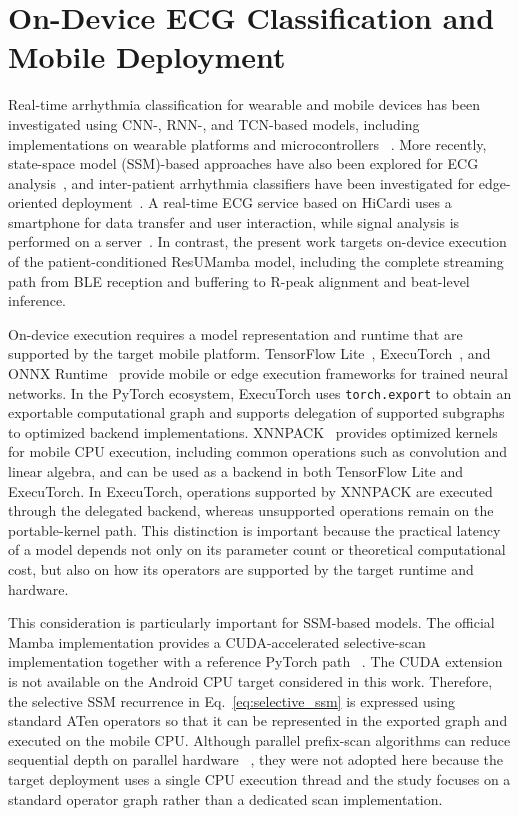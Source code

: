 \section{On-Device ECG Classification and Mobile Deployment}
\label{sec:bg_mobile_deployment}

Real-time arrhythmia classification for wearable and mobile devices has
been investigated using CNN-, RNN-, and TCN-based models, including
implementations on wearable platforms and microcontrollers
~\cite{kiranyaz2016realtime,faraone2020crnn,ingolfsson2021ecgtcn,lee2022compressed}.
More recently, state-space model (SSM)-based approaches have also been
explored for ECG analysis~\cite{lee2025atrial,bathini2026mamba}, and
inter-patient arrhythmia classifiers have been investigated for
edge-oriented deployment~\cite{xu2026cardiolike}.
A real-time ECG service based on HiCardi uses a smartphone for data
transfer and user interaction, while signal analysis is performed on a
server~\cite{park2024realtime}. In contrast, the present work targets
on-device execution of the patient-conditioned ResUMamba model,
including the complete streaming path from BLE reception and buffering
to R-peak alignment and beat-level inference.

On-device execution requires a model representation and runtime that
are supported by the target mobile platform.
TensorFlow Lite~\cite{tflite}, ExecuTorch~\cite{executorch}, and ONNX
Runtime~\cite{onnxruntime} provide mobile or edge execution frameworks
for trained neural networks. In the PyTorch ecosystem, ExecuTorch uses
\texttt{torch.export} to obtain an exportable computational graph and
supports delegation of supported subgraphs to optimized backend
implementations. XNNPACK~\cite{xnnpack} provides optimized kernels for
mobile CPU execution, including common operations such as convolution
and linear algebra, and can be used as a backend in both TensorFlow
Lite and ExecuTorch. In ExecuTorch, operations supported by XNNPACK are
executed through the delegated backend, whereas unsupported operations
remain on the portable-kernel path. This distinction is important
because the practical latency of a model depends not only on its
parameter count or theoretical computational cost, but also on how its
operators are supported by the target runtime and hardware.

This consideration is particularly important for SSM-based models.
The official Mamba implementation provides a CUDA-accelerated
selective-scan implementation together with a reference PyTorch path
~\cite{gu2023mamba}. The CUDA extension is not available on the Android
CPU target considered in this work. Therefore, the selective SSM
recurrence in Eq.~\eqref{eq:selective_ssm} is expressed using standard
ATen operators so that it can be represented in the exported graph and
executed on the mobile CPU. Although parallel prefix-scan algorithms
can reduce sequential depth on parallel hardware
~\cite{hillis1986data,blelloch1990prefix,harris2007parallel}, they were
not adopted here because the target deployment uses a single CPU
execution thread and the study focuses on a standard operator graph
rather than a dedicated scan implementation.

